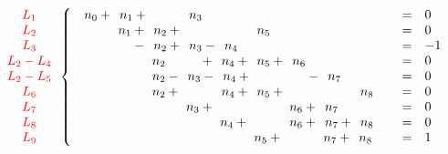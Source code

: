 \documentclass[10pt,a2paper]{article}
\begin{document}
\vspace{3em}
${\color{red}\begin{array}{c} L_1\\ L_2\\ L_3\\ L_2-L_4\\ L_2-L_5\\ L_6\\ L_7\\L_8\\L_9\end{array}    }
\left\{\begin{array}{l c l}\phantom{0}n_{0} +\phantom{0}n_{1} +\phantom{ 0n_{2} +\ } \phantom{0}n_{3} \phantom{+\ 0n_{4} +\ } \phantom{ 0n_{5} +\ } \phantom{ 0n_{6} +\ } \phantom{ 0n_{7} +\ } \phantom{ 0n_{8} +\ }&=& 0\\\phantom{ 0n_{0} +\ } \phantom{0}n_{1} +\phantom{0}n_{2} +\phantom{ 0n_{3} +\ } \phantom{ 0n_{4} +\ } \phantom{0}n_{5} \phantom{+\ 0n_{6} +\ } \phantom{ 0n_{7} +\ } \phantom{ 0n_{8} +\ }&=& 0\\\phantom{0n_{0} +\ }\phantom{0n_{1} }-\phantom{0}n_{2} +\phantom{ 0}n_{3} - \phantom{0}n_{4} \phantom{+\ 0n_{5} +\ } \phantom{ 0n_{6} +\ } \phantom{ 0n_{7} +\ } \phantom{ 0n_{8} +\ }&=& -1\\\phantom{0n_{0} +\ }\phantom{ 0n_{1} +\ } \phantom{ 0 }n_{2}  \phantom{+\ 0n_{3}  }+ \phantom{0}n_{4}+ \phantom{ 0  }n_{5}+ \phantom{0}n_{6} \phantom{+\ 0n_{7} +\ } \phantom{ 0n_{8} +\ }&=& 0\\\phantom{ 0n_{0} +\ } \phantom{0n_{1} +\ }\phantom{ 0 }n_{2} - \phantom{0}n_{3} -\phantom{0}n_{4} +\phantom{0n_{5} +\ }\phantom{ 0n_{6}  } -\phantom{0}n_{7} \phantom{+\ 0n_{8} +\ }&=& 0\\\phantom{ 0n_{0} +\ } \phantom{ 0n_{1} +\ } \phantom{0}n_{2} +\phantom{ 0n_{3} +\ } \phantom{0}n_{4} +\phantom{0}n_{5} +\phantom{ 0n_{6} +\ } \phantom{ 0n_{7} +\ } \phantom{0}n_{8} &=& 0\\\phantom{ 0n_{0} +\ } \phantom{ 0n_{1} +\ } \phantom{ 0n_{2} +\ } \phantom{0}n_{3} +\phantom{ 0n_{4} +\ } \phantom{ 0n_{5} +\ } \phantom{0}n_{6} +\phantom{0}n_{7} \phantom{+\ 0n_{8} +\ }&=& 0\\\phantom{ 0n_{0} +\ } \phantom{ 0n_{1} +\ } \phantom{ 0n_{2} +\ } \phantom{ 0n_{3} +\ } \phantom{0}n_{4} +\phantom{ 0n_{5} +\ } \phantom{0}n_{6} +\phantom{0}n_{7} +\phantom{0}n_{8} &=& 0\\\phantom{ 0n_{0} +\ } \phantom{ 0n_{1} +\ } \phantom{ 0n_{2} +\ } \phantom{ 0n_{3} +\ } \phantom{ 0n_{4} +\ } \phantom{0}n_{5} +\phantom{ 0n_{6} +\ } \phantom{0}n_{7} +\phantom{0}n_{8} &=& 1\\\end{array}\right.$
\end{document}
